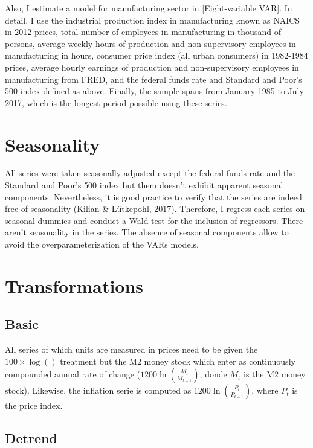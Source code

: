 \documentclass[12pt,twoside]{reedthesis}
\begin{document}
Also, I estimate a model for manufacturing sector in {[}Eight-variable VAR{]}. In detail, I use the industrial production index in manufacturing known as NAICS in 2012 prices, total number of employees in manufacturing in thousand of persons, average weekly hours of production and non-supervisory employees in manufacturing in hours, consumer price index (all urban consumers) in 1982-1984 prices, average hourly earnings of production and non-supervisory employees in manufacturing from FRED, and the federal funds rate and Standard and Poor's 500 index defined as above. Finally, the sample spans from January 1985 to July 2017, which is the longest period possible using these series.

\hypertarget{seasonality}{%
\section{Seasonality}\label{seasonality}}

All series were taken seasonally adjusted except the federal funds rate and the Standard and Poor's 500 index but them doesn't exhibit apparent seasonal components. Nevertheless, it is good practice to verify that the series are indeed free of seasonality (Kilian \& Lütkepohl, 2017). Therefore, I regress each series on seasonal dummies and conduct a Wald test for the inclusion of regressors. There aren't seasonality in the series. The absence of seasonal components allow to avoid the overparameterization of the VARs models.

\hypertarget{transformations}{%
\section{Transformations}\label{transformations}}

\hypertarget{basic}{%
\subsection{Basic}\label{basic}}

All series of which units are measured in prices need to be given the \(100 \times \log()\) treatment but the M2 money stock which enter as continuously compounded annual rate of change (\(1200 \ln(\frac{M_{t}}{M_{t - 1}})\), donde \(M_{t}\) is the M2 money stock). Likewise, the inflation serie is computed as \(1200 \ln(\frac{P_{t}}{P_{t - 1}})\), where \(P_{t}\) is the price index.

\hypertarget{detrend}{%
\subsection{Detrend}\label{detrend}}
\end{document}
